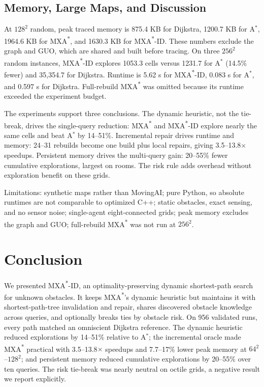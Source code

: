 \documentclass[conference]{IEEEtran}
\newcommand{\MXA}{MXA\textsuperscript{*}}
\newcommand{\MXAID}{MXA\textsuperscript{*}-ID}
\begin{document}
\subsection{Memory, Large Maps, and Discussion}
At $128^2$ random, peak traced memory is 875.4 KB for Dijkstra, 1200.7 KB for A$^*$, 1964.6 KB for \MXA{}, and 1630.3 KB for \MXAID. These numbers exclude the graph and GUO, which are shared and built before tracing. On three $256^2$ random instances, \MXAID{} explores 1053.3 cells versus 1231.7 for A$^*$ (14.5\% fewer) and 35,354.7 for Dijkstra. Runtime is 5.62 s for \MXAID{}, 0.083 s for A$^*$, and 0.597 s for Dijkstra. Full-rebuild \MXA{} was omitted because its runtime exceeded the experiment budget.

The experiments support three conclusions. The dynamic heuristic, not the tie-break, drives the single-query reduction: \MXA{} and \MXAID{} explore nearly the same cells and beat A$^*$ by 14--51\%. Incremental repair drives runtime and memory: 24--31 rebuilds become one build plus local repairs, giving 3.5--13.8$\times$ speedups. Persistent memory drives the multi-query gain: 20--55\% fewer cumulative explorations, largest on rooms. The risk rule adds overhead without exploration benefit on these grids.

Limitations: synthetic maps rather than MovingAI; pure Python, so absolute runtimes are not comparable to optimized C++; static obstacles, exact sensing, and no sensor noise; single-agent eight-connected grids; peak memory excludes the graph and GUO; full-rebuild \MXA{} was not run at $256^2$.

\section{Conclusion}
\label{sec:conclusion}
We presented \MXAID, an optimality-preserving dynamic shortest-path search for unknown obstacles. It keeps \MXA{}'s dynamic heuristic but maintains it with shortest-path-tree invalidation and repair, shares discovered obstacle knowledge across queries, and optionally breaks ties by obstacle risk. On 956 validated runs, every path matched an omniscient Dijkstra reference. The dynamic heuristic reduced explorations by 14--51\% relative to A$^*$; the incremental oracle made \MXA{} practical with 3.5--13.8$\times$ speedups and 7.7--17\% lower peak memory at $64^2$--$128^2$; and persistent memory reduced cumulative explorations by 20--55\% over ten queries. The risk tie-break was nearly neutral on octile grids, a negative result we report explicitly.
\end{document}
